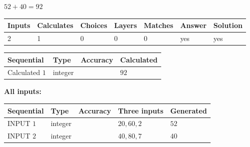 \documentclass[12pt]{article}
\begin{document}
 

$ %
52 +  %
40=   %
92$
 
 
\noindent{}
 
 

 
   
   
   
   
\noindent\begin{tabular}{|l|l|l|l|l|l|l|}
 \hline
Inputs & Calculates & Choices & Layers & Matches & Answer & Solution \\ \hline
 2  & 
 1  & 
 0
  & 
 0  & 
 0  & 
  yes & 
  yes 
  \\ \hline
 \end{tabular}
   
   
   
   
\noindent{}
   
   
  
  
\noindent\begin{tabular}{|l|l|l|l|}
\hline
 Sequential & Type & Accuracy & Calculated \\ 
\hline
 
 
  Calculated $  1 $ & integer &  & 
  $ 92 $ 
 \\  \hline  
 \end{tabular}
   
   
   
   
\noindent\vspace{0.1in}\hspace{-0.08in} {\textbf{\Large{All inputs: }}}
   
   
  
  
\noindent\begin{tabular}{|l|l|l|l|l|}
\hline
 Sequential & Type & Accuracy & Three inputs & Generated \\ 
\hline
 
 
  INPUT $  1 $ & integer &  & $
 20
 , 
 60
 , 
 2
 $ & $ 52 $ 
 \\  \hline  
 
 
  INPUT $  2 $ & integer &  & $
 40
 , 
 80
 , 
 7
 $ & $ 40 $ 
 \\  \hline  
 \end{tabular}
   
   
   
   
   
   
 \vspace{0.2in}
 
\end{document}

